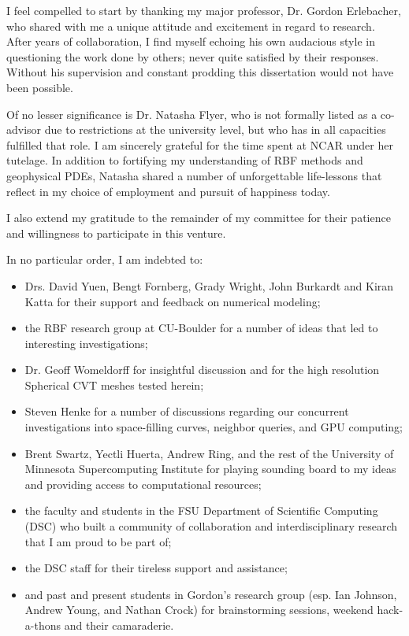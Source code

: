 \begin{acknowledgments}

I feel compelled to start by thanking my major professor, Dr. Gordon Erlebacher, who shared with me a unique attitude and excitement in regard to research. After years of collaboration, I find myself echoing his own audacious style in questioning the work done by others; never quite satisfied by their responses. Without his supervision and constant prodding this dissertation would not have been possible. %

Of no lesser significance is Dr. Natasha Flyer, who is not formally listed as a co-advisor due to restrictions at the university level, but who has in all capacities fulfilled that role. I am sincerely grateful for the time spent at NCAR under her tutelage. In addition to fortifying my understanding of RBF methods and geophysical PDEs, Natasha shared a number of unforgettable life-lessons that reflect in my choice of employment and pursuit of happiness today. 

I also extend my gratitude to the remainder of my committee for their patience and willingness to participate in this venture. 

In no particular order, I am indebted to:
\begin{itemize}
\item Drs. David Yuen, Bengt Fornberg, Grady Wright, John Burkardt and Kiran Katta for their support and feedback on numerical modeling;
\item the RBF research group at CU-Boulder for a number of ideas that led to interesting investigations;
\item Dr. Geoff Womeldorff for insightful discussion and for the high resolution Spherical CVT meshes tested herein;
\item Steven Henke for a number of discussions regarding our concurrent investigations into space-filling curves, neighbor queries, and GPU computing;
\item Brent Swartz, Yectli Huerta, Andrew Ring, and the rest of the University of Minnesota Supercomputing Institute for playing sounding board to my ideas and providing access to computational resources;
\item the faculty and students in the FSU Department of Scientific Computing (DSC) who built a community of collaboration and interdisciplinary research that I am proud to be part of;
\item the DSC staff for their tireless support and assistance;  
\item and past and present students in Gordon's research group (esp. Ian Johnson, Andrew Young, and Nathan Crock) for brainstorming sessions, weekend hack-a-thons and their camaraderie.
\end{itemize}


\end{acknowledgments}
